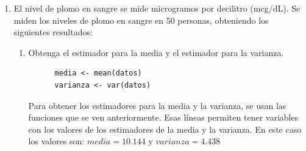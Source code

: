 \documentclass[12pt,a4paper]{article}
\begin{document}
\begin{enumerate}
\begin{enumerate}
    \item La cantidad de proteína no debe variar más de 0.1 gramos, en caso contrario se debe ajustar el proceso de producción. Plantee y resuelva una prueba de hipótesis para tomar una decisión sonre el proceso de producción.
    \begin{enumerate}
      \item \textbf{Hipótesis}
      En este caso necesitamos que la cantidad de proteína no varíe más de 0.1 gramos. Por lo que nuestras hipótesis quedan de la siguiente manera:
      \[
        \begin{array}{c}
          H_o : \sigma^2 = 0.1 \\
          H_a : \sigma^2 < 0.1 \\
          \\
          \sigma^2_0 = 0.1
        \end{array}
      \]

      \item \textbf{Estadístico de prueba}
      La fórmula para el estadístico de prueba es:
      \[
        X^2_0=\frac{(n-1)\mathcal{S}^2}{\sigma^2_0}
      \]
      
      \item \textbf{Criterio de rechazo}
      Se rechaza \(H_o\) si: \(X^2_0<X^2_{1-\alpha},n-1\). Esta comparación la ponemos en R y se ve de la siguiente manera:
      \begin{lstlisting}
        X0 <- (n-1)*varianza/s0
        X <- qchisq(alpha,n-1)
      \end{lstlisting}

      Los valores obtenidos son: \(X^2_0=10.289\) y \(X=13.8484\). Ahora nos hacemos la pregunta si \(X^2_0<X\). De acuerdo a los valores esto es cierto, por lo que se rechaza \(H_o\). Esto significa que hay evidencia estadística que indica que \(\sigma^2<0.1\). Por lo que no hay que modificar el proceso de producción. Hay que considerar que el valor de alpha usado para este esta prueba de hipótesis fue de 0.05.
    \end{enumerate}
  \end{enumerate}
  
  \item El nivel de plomo en sangre se mide microgramos por decilitro (mcg/dL). Se miden los niveles de plomo en sangre en 50 personas, obteniendo los siguientes resultados:

  \begin{enumerate}
    \item Obtenga el estimador para la media y el estimador para la varianza.
    \begin{lstlisting}
      media <- mean(datos)
      varianza <- var(datos)
    \end{lstlisting}
    Para obtener los estimadores para la media y la varianza, se usan las funciones que se ven anteriormente. Esas líneas permiten tener variables con los valores de los estimadores de la media y la varianza. En este caso los valores son: $ media = 10.144$ y $ varianza = 4.438 $
    \\


\end{enumerate}
\end{enumerate}
\end{document}
